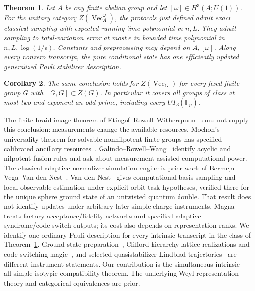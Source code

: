\documentclass[11pt]{amsart}
\newtheorem{theorem}{Theorem}
\newtheorem{corollary}[theorem]{Corollary}
\theoremstyle{definition}\newtheorem{definition}[theorem]{Definition}
\newcommand{\VEC}{\operatorname{Vec}}
\begin{document}
\begin{theorem}\label{thm:main}
Let $A$ be any finite abelian group and let $[\omega]\in H^3(A;U(1))$.
For the unitary category $Z(\VEC_A^\omega)$, the protocols just defined admit
exact classical sampling with expected running time polynomial in $n,L$.
They admit sampling to total-variation error at most $\epsilon$ in bounded
time polynomial in $n,L,\log(1/\epsilon)$. Constants and preprocessing may
depend on $A,[\omega]$. Along every nonzero transcript, the pure conditional
state has one efficiently updated generalized Pauli stabilizer description.
\end{theorem}

\begin{corollary}\label{cor:nil2}
The same conclusion holds for $Z(\VEC_G)$ for every fixed finite group $G$
with $[G,G]\subset Z(G)$. In particular it covers all groups of class at most
two and exponent an odd prime, including every $UT_3(\mathbb F_p)$.
\end{corollary}

The finite braid-image theorem of Etingof--Rowell--Witherspoon~\cite{ERW}
does not supply this conclusion: measurements change the available resources.
Mochon's universality theorem for solvable nonnilpotent finite groups has specified
calibrated ancillary resources~\cite{Mochon}. Galindo--Rowell--Wang~\cite{GRW}
identify acyclic and nilpotent fusion rules and ask about measurement-assisted
computational power. The classical adaptive normalizer simulation engine is
prior work of Bermejo-Vega--Van den Nest~\cite{BV}.
Van den Nest~\cite[Theorem 4 and Section IX.D]{VDN} gives computational-basis
sampling and local-observable estimation under explicit orbit-task hypotheses,
verified there for the unique sphere ground state of an untwisted quantum double.
That result does not identify updates under arbitrary later simple-charge
instruments. Magna~\cite{Magna} treats factory acceptance/fidelity networks
and specified adaptive syndrome/code-switch outputs; its cost also depends on
representation ranks. We identify one ordinary Pauli description for every
intrinsic transcript in the class of Theorem~\ref{thm:main}.
Ground-state preparation~\cite{TVV}, Clifford-hierarchy lattice realizations
and code-switching magic~\cite{Fechisin}, and selected quasistabilizer Lindblad
trajectories~\cite{Chirame} are different instrument statements. Our contribution is the simultaneous intrinsic all-simple-isotypic compatibility theorem.
The underlying Weyl representation theory and categorical equivalences are prior.
\end{document}
